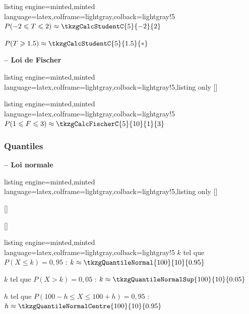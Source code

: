 \documentclass[11pt,a4paper]{ltxdoc}
\begin{document}
\begin{tcblisting}{listing engine=minted,minted language=latex,colframe=lightgray,colback=lightgray!5}
$P(-2 \leqslant T \leqslant 2) \approx \tkzgCalcStudentC{5}{-2}{2}$

$P(T \geqslant 1.5) \approx \tkzgCalcStudentC{5}{1.5}{*}$
\end{tcblisting}

\textbf{-- Loi de Fischer}

\begin{tcblisting}{listing engine=minted,minted language=latex,colframe=lightgray,colback=lightgray!5,listing only}
[\macro]
\end{tcblisting}

\begin{tcblisting}{listing engine=minted,minted language=latex,colframe=lightgray,colback=lightgray!5}
$P(1 \leqslant F \leqslant 3) \approx \tkzgCalcFischerC{5}{10}{1}{3}$
\end{tcblisting}

\subsubsection{Quantiles}

\textbf{-- Loi normale}

\begin{tcblisting}{listing engine=minted,minted language=latex,colframe=lightgray,colback=lightgray!5,listing only}
[\macro]

[\macro]

[\macro]
\end{tcblisting}

\begin{tcblisting}{listing engine=minted,minted language=latex,colframe=lightgray,colback=lightgray!5}
$k$ tel que $P(X \leqslant k)=0{,}95$ :
$k \approx \tkzgQuantileNormal{100}{10}{0.95}$

$k$ tel que $P(X > k)=0{,}05$ :
$k \approx \tkzgQuantileNormalSup{100}{10}{0.05}$

$h$ tel que $P(100-h \leqslant X \leqslant 100+h)=0{,}95$ :
$h \approx \tkzgQuantileNormalCentre{100}{10}{0.95}$
\end{tcblisting}
\end{document}
